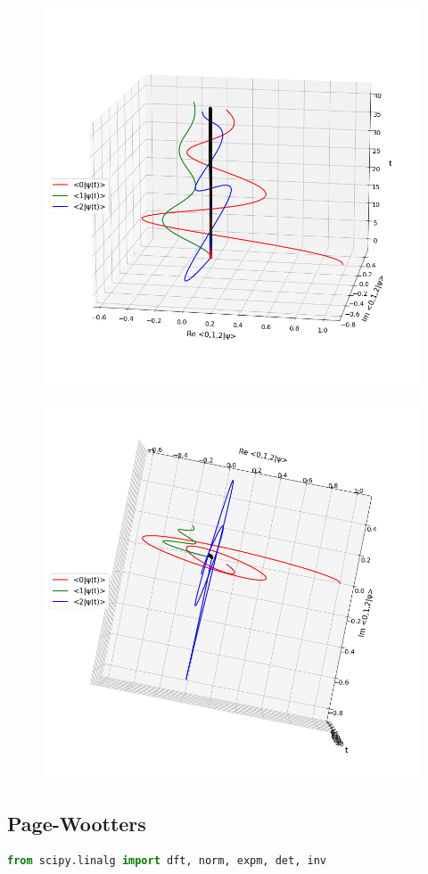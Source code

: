 \begin{figure}[h!]
\centering
\includegraphics[width=0.66\linewidth]{tex/appendix/nb/jupyter/3lev/output_48_0.png}
\end{figure}

\begin{figure}[h!]
\centering
\includegraphics[width=0.66\linewidth]{tex/appendix/nb/jupyter/3lev/output_48_1.png}

\end{figure}

\hypertarget{page-wootters}{%
\subsection{Page-Wootters}\label{appendix:jupyter:3lev:page-wootters}}

\begin{lstlisting}[language=Python]
from scipy.linalg import dft, norm, expm, det, inv
\end{lstlisting}

